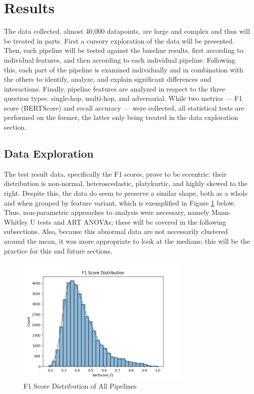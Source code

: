 \section{Results}

The data collected, almost 40,000 datapoints, are large and complex and thus will be treated in parts. First a cursory exploration of the data will be presented. Then, each pipeline will be tested against the baseline results, first according to individual features, and then according to each individual pipeline. Following this, each part of the pipeline is examined individually and in combination with the others to identify, analyze, and explain significant differences and interactions. Finally, pipeline features are analyzed in respect to the three question types: single-hop, multi-hop, and adversarial. While two metrics — F1 score (BERTScore) and recall accuracy — were collected, all statistical tests are performed on the former, the latter only being treated in the data exploration section.



\subsection{Data Exploration}

The test result data, specifically the F1 scores, prove to be eccentric: their distribution is non-normal, heteroscedastic, platykurtic, and highly skewed to the right. Despite this, the data do seem to preserve a similar shape, both as a whole and when grouped by feature variant, which is exemplified in Figure \ref{fig:f1_score_distribution_all} below. Thus, non-parametric approaches to analysis were necessary, namely Mann-Whitley U tests and ART ANOVAs; these will be covered in the following subsections. Also, because this abnormal data are not necessarily clustered around the mean, it was more appropriate to look at the medians; this will be the practice for this and future sections.

\begin{figure}[p]
\centering
\includegraphics[width=0.75\textwidth]{charts/f1_score_distribution_all.png}
\caption{F1 Score Distribution of All Pipelines}
\label{fig:f1_score_distribution_all}
\end{figure}


